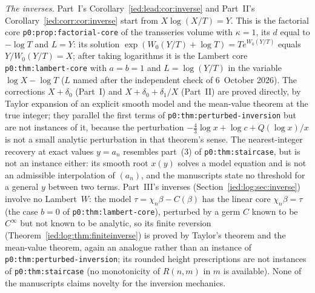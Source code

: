 \documentclass[11pt,letterpaper]{article}
\theoremstyle{remark}\newtheorem{remark}[theorem]{Remark}
\begin{document}
\emph{The inverses.} Part~I's Corollary~\ref{ied:lead:cor:inverse} and Part~II's Corollary~\ref{ied:corr:cor:inverse} start from $X\log(X/T)=Y$. This is the factorial core \texttt{p0:prop:factorial-core} of the transseries volume \cite{TSvol} with $\kappa=1$, its $d$ equal to $-\log T$ and $L=Y$: its solution $\exp(W_0(Y/T)+\log T)=Te^{W_0(Y/T)}$ equals $Y/W_0(Y/T)=X$; after taking logarithms it is the Lambert core \texttt{p0:thm:lambert-core} with $a=b=1$ and $L=\log(Y/T)$ in the variable $\log X-\log T$ \textup{($L$ named after the independent check of 6~October 2026)}. The corrections $X+\delta_0$ (Part~I) and $X+\delta_0+\delta_1/X$ (Part~II) are proved directly, by Taylor expansion of an explicit smooth model and the mean-value theorem at the true integer; they parallel the first terms of \texttt{p0:thm:perturbed-inversion} but are not instances of it, because the perturbation $-\frac43\log x+\log c+Q(\log x)/x$ is not a small analytic perturbation in that theorem's sense. The nearest-integer recovery at exact values $y=a_n$ resembles part~(3) of \texttt{p0:thm:staircase}, but is not an instance either: its smooth root $x(y)$ solves a model equation and is not an admissible interpolation of $(a_n)$, and the manuscripts state no threshold for a general $y$ between two terms. Part~III's inverses (Section~\ref{ied:log:sec:inverse}) involve no Lambert~$W$: the model $\tau=\chi_n\beta-C(\beta)$ has the linear core $\chi_n\beta=\tau$ (the case $b=0$ of \texttt{p0:thm:lambert-core}), perturbed by a germ $C$ known to be $C^\infty$ but not known to be analytic, so its finite reversion (Theorem~\ref{ied:log:thm:finiteinverse}) is proved by Taylor's theorem and the mean-value theorem, again an analogue rather than an instance of \texttt{p0:thm:perturbed-inversion}; its rounded height prescriptions are not instances of \texttt{p0:thm:staircase} (no monotonicity of $R(n,m)$ in $m$ is available). None of the manuscripts claims novelty for the inversion mechanics.
\end{document}

